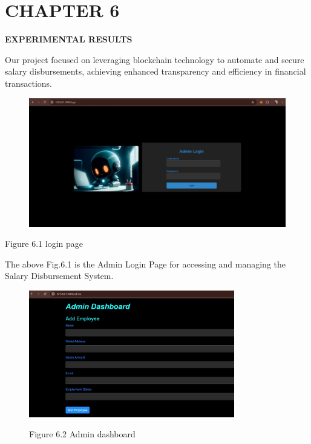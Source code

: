 \documentclass[12pt]{report}
\begin{document}
\newpage
\section*{CHAPTER 6}
\vspace{1EM}
\begin{center}
    \textbf{\fontsize{16pt}{21.6pt}\selectfont EXPERIMENTAL RESULTS}  %
\end{center}
\vspace{0.5em}
\begin{center}
    \justify
Our project focused on leveraging blockchain technology to automate and secure salary disbursements, achieving enhanced transparency and efficiency in financial transactions.
\end{center}
\vspace{4em}
\begin{figure}[h!]
    \centering
    \includegraphics[width=\textwidth]{login.jpg} %
\end{figure}
\begin{center}
    Figure 6.1 login page
\end{center}
\begin{center}
    \justify
The above Fig.6.1 is the Admin Login Page for accessing and managing the Salary Disbursement System.
\end{center}
\newpage
\begin{figure}[h!]
  \centering
  \includegraphics[width=0.8\textwidth]{dashboard.jpg}
  \begin{center}
    Figure 6.2 Admin dashboard
\end{center}
\end{figure}
\end{document}
